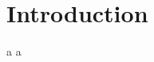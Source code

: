 \documentclass[../../main.tex]{subfiles}
\begin{document}
\footnotesize
\section{Introduction}

a\cite{TestRef} a

\lipsum[2-4]
\end{document}

